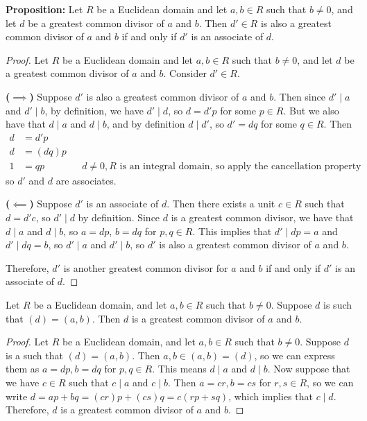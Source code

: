 \documentclass [12pt] {article}
\newenvironment{theorem}[1]{\begin{tcolorbox}[title={Theorem #1},colback=green!5!white,colframe=black!75!green]}{\end{tcolorbox}}
\renewcommand{\bf}[1]{\textbf{{#1}}}
\begin{document}
\newpage
\bf{Proposition:} Let $R$ be a Euclidean domain and let $a, b \in R$ such that $b \neq 0$, and let
$d$ be a greatest common divisor of $a$ and $b$. Then $d' \in R$ is also a greatest common divisor
of $a$ and $b$ if and only if $d'$ is an associate of $d$.
\begin{proof}
    Let $R$ be a Euclidean domain and let $a, b \in R$ such that $b \neq 0$, and let
    $d$ be a greatest common divisor of $a$ and $b$. Consider $d' \in R$.
    \vspace{0.5em}

    \bf{($\bm{\implies}$)}
    Suppose $d'$ is also a greatest common divisor of $a$ and $b$. Then since $d' \mid a$ and
    $d' \mid b$, by definition, we have $d' \mid d$, so $d = d'p$ for some $p \in R$. But we also
    have that $d \mid a$ and $d \mid b$, and by definition $d \mid d'$, so $d' = dq$ for some
    $q \in R$. Then
    \begin{align*}
        d &= d'p \\
        d &= (dq)p \\
        1 &= qp && d \neq 0, R \text{ is an integral domain, so apply the cancellation property}
    \end{align*}
    so $d'$ and $d$ are associates.
    \vspace{0.5em}

    \bf{($\bm{\impliedby}$)}
    Suppose $d'$ is an associate of $d$. Then there exists a unit $c \in R$ such that $d = d'c$,
    so $d' \mid d$ by definition. Since $d$ is a greatest common divisor, we have that $d \mid a$
    and $d \mid b$, so $a = dp$, $b = dq$ for $p, q \in R$. This implies that $d' \mid dp = a$ and
    $d' \mid dq = b$, so $d' \mid a$ and $d' \mid b$, so $d'$ is also a greatest common divisor of
    $a$ and $b$.
    \vspace{0.5em}

    Therefore, $d'$ is another greatest common divisor for $a$ and $b$ if and only if $d'$ is an
    associate of $d$.
\end{proof}

\begin{theorem}{}
    Let $R$ be a Euclidean domain, and let $a, b \in R$ such that $b \neq 0$. Suppose $d$ is such
    that $(d) = (a, b)$. Then $d$ is a greatest common divisor of $a$ and $b$.
\end{theorem}
\begin{proof}
    Let $R$ be a Euclidean domain, and let $a, b \in R$ such that $b \neq 0$. Suppose $d$ is a such
    that $(d) = (a, b)$. Then $a, b \in (a, b) = (d)$, so we can express them as
    $a = dp, b = dq$ for $p, q \in R$. This means $d \mid a$ and $d \mid b$. Now suppose that
    we have $c \in R$ such that $c \mid a$ and $c \mid b$. Then $a = cr, b = cs$ for $r, s \in R$,
    so we can write $d = ap + bq = (cr)p + (cs)q = c(rp + sq)$, which implies that $c \mid d$.
    Therefore, $d$ is a greatest common divisor of $a$ and $b$.
\end{proof}
\end{document}
